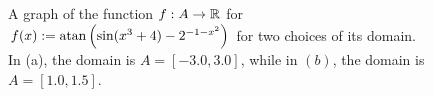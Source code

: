    
    \begin{figure}[htb]%
\centering
{}%
\hspace{5pt}%
%
    \caption[]{A graph of the function $f:A \to \mathbb R$ for $f(x):= \mathrm{atan}\left( \sin(x^3 + 4) - 2^{-1 - x^2} \right)$ for two choices of its domain. In (a), the domain is $A = [-3.0, 3.0]$, while in $(b)$, the domain is $A = [1.0, 1.5]$. }
   \label{fig:FunctionDifferentDomains}
\end{figure}

\bigskip


